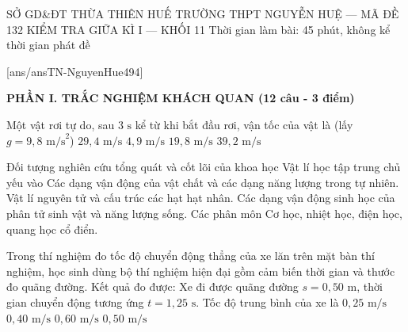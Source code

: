 \def\toanlop{10}
\def\thoigian{45}
\def\namhoc{2024 - 2025}
\begin{dethi}
	{SỞ GD\&ĐT THỪA THIÊN HUẾ}
	{TRƯỜNG THPT NGUYỄN HUỆ --- MÃ ĐỀ 132}
	{KIỂM TRA GIỮA KÌ I --- KHỐI 11}
	{Thời gian làm bài: 45 phút, không kể thời gian phát đề}
\end{dethi}
	
	[ans/ansTN-NguyenHue494]
	
	\noindent \textbf{PHẦN I. TRẮC NGHIỆM KHÁCH QUAN (12 câu - 3 điểm)}
	\vspace{0.2cm}
	
	\begin{ex}%
		Một vật rơi tự do, sau $3\text{ s}$ kể từ khi bắt đầu rơi, vận tốc của vật là (lấy $g = 9,8\text{ m/s}^2$)
		\choice
		{\True $29,4\text{ m/s}$}
		{$4,9\text{ m/s}$}
		{$19,8\text{ m/s}$}
		{$39,2\text{ m/s}$}
	\end{ex}
	
	\begin{ex}%
		Đối tượng nghiên cứu tổng quát và cốt lõi của khoa học Vật lí học tập trung chủ yếu vào
		\choice
		{\True Các dạng vận động của vật chất và các dạng năng lượng trong tự nhiên.}
		{Vật lí nguyên tử và cấu trúc các hạt hạt nhân.}
		{Các dạng vận động sinh học của phân tử sinh vật và năng lượng sống.}
		{Các phân môn Cơ học, nhiệt học, điện học, quang học cổ điển.}
	\end{ex}
	
	\begin{ex}%
		Trong thí nghiệm đo tốc độ chuyển động thẳng của xe lăn trên mặt bàn thí nghiệm, học sinh dùng bộ thí nghiệm hiện đại gồm cảm biến thời gian và thước đo quãng đường. Kết quả đo được: Xe đi được quãng đường $s = 0,50\text{ m}$, thời gian chuyển động tương ứng $t = 1,25\text{ s}$. Tốc độ trung bình của xe là
		\choice
		{$0,25\text{ m/s}$}
		{\True $0,40\text{ m/s}$}
		{$0,60\text{ m/s}$}
		{$0,50\text{ m/s}$}
	\end{ex}
	
